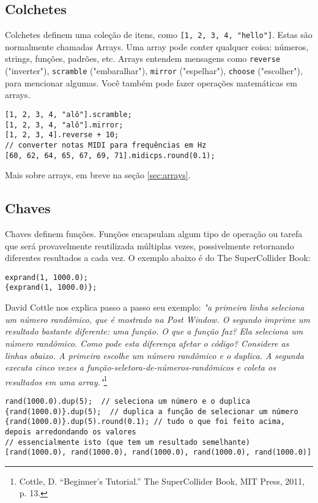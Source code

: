 \subsection{Colchetes}

Colchetes definem uma coleção de itens, como \texttt{[1, 2, 3, 4, "hello"]}. Estas são normalmente chamadas Arrays. Uma array pode conter qualquer coisa: números, strings, funções, padrões, etc. Arrays entendem mensagens como \texttt{reverse} ("inverter"), \texttt{scramble} ("embaralhar"), \texttt{mirror} ("espelhar"), \texttt{choose} ("escolher"), para mencionar algumas. Você também pode fazer operações matemáticas em arrays.


\begin{lstlisting}[style=SuperCollider-IDE, basicstyle=\scttfamily\footnotesize]
[1, 2, 3, 4, "alô"].scramble;
[1, 2, 3, 4, "alô"].mirror;
[1, 2, 3, 4].reverse + 10;
// converter notas MIDI para frequências em Hz 
[60, 62, 64, 65, 67, 69, 71].midicps.round(0.1);
\end{lstlisting}

Mais sobre arrays, em breve na seção \ref{sec:arrays}.

\subsection{Chaves}

Chaves definem funções. Funções encapsulam algum tipo de operação ou tarefa que será provavelmente reutilizada múltiplas vezes, possivelmente retornando diferentes resultados a cada vez. O exemplo abaixo é do The SuperCollider Book:

\begin{lstlisting}[style=SuperCollider-IDE, basicstyle=\scttfamily\footnotesize]
exprand(1, 1000.0);
{exprand(1, 1000.0)};
\end{lstlisting}

David Cottle nos explica passo a passo seu exemplo: \textit{"a primeira linha seleciona um número randômico, que é mostrado na Post Window. O segundo imprime um resultado bastante diferente: uma função. O que a função faz? Ela seleciona um número randômico. Como pode esta diferença afetar o código? Considere as linhas abaixo. A primeira escolhe um número randômico e o duplica. A segunda executa  cinco vezes a função-seletora-de-números-randômicos e coleta os resultados em uma array."}\footnote{Cottle, D. ``Beginner's Tutorial.'' The SuperCollider Book, MIT Press, 2011, p. 13.}

\begin{lstlisting}[style=SuperCollider-IDE, basicstyle=\scttfamily\footnotesize]
rand(1000.0).dup(5);  // seleciona um número e o duplica
{rand(1000.0)}.dup(5);  // duplica a função de selecionar um número {rand(1000.0)}.dup(5).round(0.1); // tudo o que foi feito acima, depois arredondando os valores
// essencialmente isto (que tem um resultado semelhante)
[rand(1000.0), rand(1000.0), rand(1000.0), rand(1000.0), rand(1000.0)]
\end{lstlisting}
 
